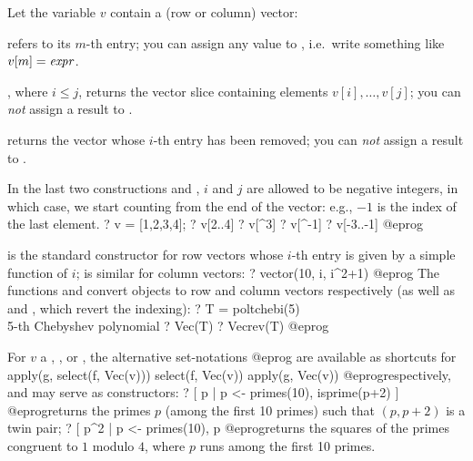 Let the variable $v$ contain a (row or column) vector:

\item {} refers to its $m$-th entry; you can assign any value to
,  i.e.~write something like $v[m]=\hbox{\it expr\/}$.

\item {}, where $i \leq j$, returns the vector slice containing
elements $v[i],\dots, v[j]$; you can \emph{not} assign a result to
.

\item {} returns the vector whose $i$-th entry has been removed;
you can \emph{not} assign a result to .

\noindent In the last two constructions  and ,
$i$ and $j$ are allowed to be negative integers, in which case, we start
counting from the end of the vector: e.g., $-1$ is the index of the last
element.
\bprog
? v = [1,2,3,4];
? v[2..4]
? v[^3]
? v[^-1]
? v[-3..-1]
@eprog

  is the standard constructor for row vectors
 whose $i$-th entry is given by a simple function of $i$; 
 is similar for column vectors:
 \bprog
 ? vector(10, i, i^2+1)
 @eprog
 The functions  and  convert objects to row and column
vectors respectively (as well as  and , which revert
the indexing):
 \bprog
 ? T = poltchebi(5)   \\ 5-th Chebyshev polynomial
 ? Vec(T)
 ? Vecrev(T)
 @eprog

 For $v$ a , ,  or ,
 the alternative set-notations
 \bprog
 [g(x) | x <- v, f(x)]
 [x | x <- v, f(x)]
 [g(x) | x <- v]
 @eprog\noindent
 are available as shortcuts for
 \bprog
 apply(g, select(f, Vec(v)))
 select(f, Vec(v))
 apply(g, Vec(v))
 @eprog\noindent respectively, and may serve as  constructors:
 \bprog
 ? [ p | p <- primes(10), isprime(p+2) ]
 @eprog\noindent returns the primes $p$ (among the first 10 primes) such
 that $(p, p+2)$ is a twin pair;
 \bprog
 ? [ p^2 | p <- primes(10), p %
 @eprog\noindent returns the squares of the primes congruent to $1$ modulo $4$,
 where $p$ runs among the first 10 primes.

